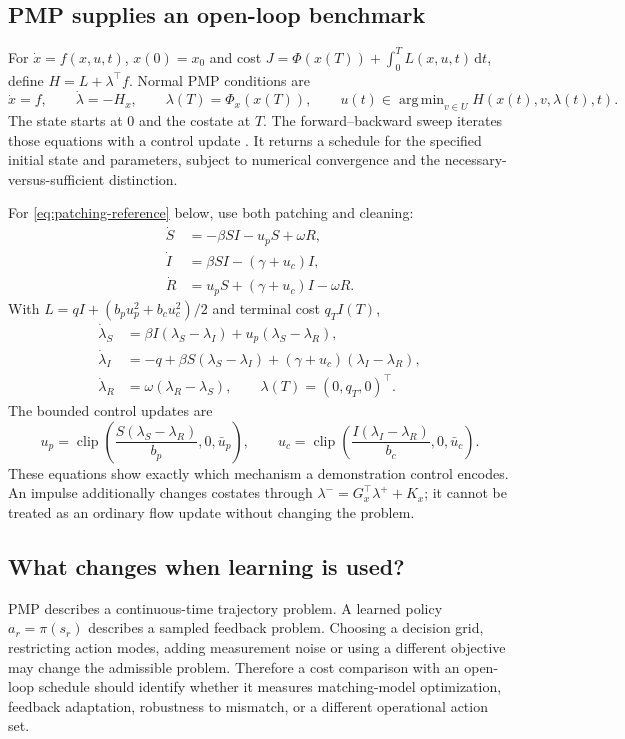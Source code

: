 \documentclass[11pt,a4paper]{article}
\newcommand{\dd}{\,\mathrm{d}}
\DeclareMathOperator{\clip}{clip}
\DeclareMathOperator*{\argmin}{arg\,min}
\theoremstyle{definition}
\theoremstyle{remark}
\begin{document}
\subsection{PMP supplies an open-loop benchmark}
For $\dot x=f(x,u,t)$, $x(0)=x_0$ and cost
$J=\Phi(x(T))+\int_0^T L(x,u,t)\dd t$, define $H=L+\lambda^\top f$.
Normal PMP conditions are
\begin{equation}
\dot x=f,\qquad \dot\lambda=-H_x,\qquad
\lambda(T)=\Phi_x(x(T)),\qquad
u(t)\in\argmin_{v\in U}H(x(t),v,\lambda(t),t).
\end{equation}
The state starts at $0$ and the costate at $T$. The forward--backward sweep iterates those equations with a control update \cite{pontryagin,lenhart}. It returns a schedule for the specified initial state and parameters, subject to numerical convergence and the necessary-versus-sufficient distinction.

For \eqref{eq:patching-reference} below, use both patching and cleaning:
\begin{align}
\dot S&=-\beta SI-u_pS+\omega R,\nonumber\\
\dot I&=\beta SI-(\gamma+u_c)I,\label{eq:patching-reference}\\
\dot R&=u_pS+(\gamma+u_c)I-\omega R.\nonumber
\end{align}
With $L=qI+(b_pu_p^2+b_cu_c^2)/2$ and terminal cost $q_TI(T)$,
\begin{align}
\dot\lambda_S&=\beta I(\lambda_S-\lambda_I)+u_p(\lambda_S-\lambda_R),\nonumber\\
\dot\lambda_I&=-q+\beta S(\lambda_S-\lambda_I)
 +(\gamma+u_c)(\lambda_I-\lambda_R),\nonumber\\
\dot\lambda_R&=\omega(\lambda_R-\lambda_S),\qquad
\lambda(T)=(0,q_T,0)^\top.
\end{align}
The bounded control updates are
\begin{equation}
u_p=\clip\left(\frac{S(\lambda_S-\lambda_R)}{b_p},0,\bar u_p\right),\qquad
u_c=\clip\left(\frac{I(\lambda_I-\lambda_R)}{b_c},0,\bar u_c\right).
\end{equation}
These equations show exactly which mechanism a demonstration control encodes. An impulse additionally changes costates through
$\lambda^-=G_x^\top\lambda^++K_x$; it cannot be treated as an ordinary flow update without changing the problem.

\subsection{What changes when learning is used?}
PMP describes a continuous-time trajectory problem. A learned policy $a_r=\pi(s_r)$ describes a sampled feedback problem. Choosing a decision grid, restricting action modes, adding measurement noise or using a different objective may change the admissible problem. Therefore a cost comparison with an open-loop schedule should identify whether it measures matching-model optimization, feedback adaptation, robustness to mismatch, or a different operational action set.
\end{document}
